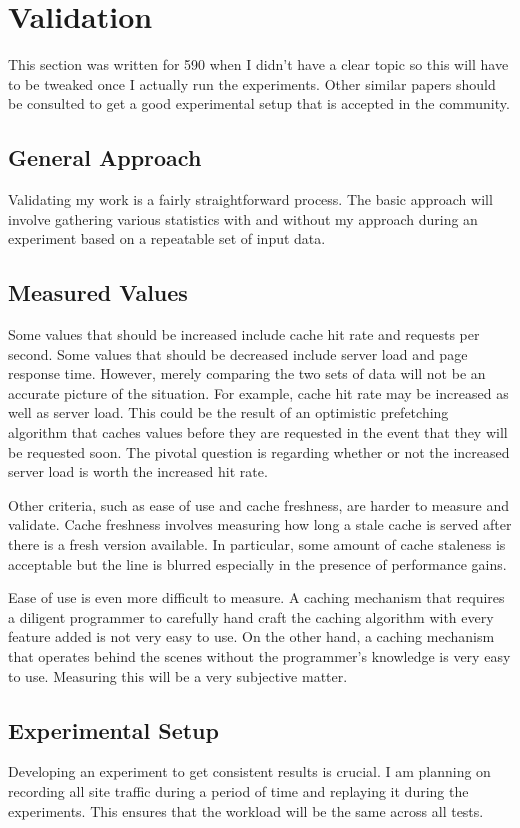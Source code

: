 \documentclass[12pt]{ucthesis}
\begin{document}
\chapter{Validation}
\label{validation}
This section was written for 590 when I didn't have a clear topic so this will have to be tweaked once I actually run the experiments.
Other similar papers should be consulted to get a good experimental setup that is accepted in the community.

\section{General Approach}
Validating my work is a fairly straightforward process.
The basic approach will involve gathering various statistics with and without my approach during an experiment based on a repeatable set of input data. %

\section{Measured Values}
Some values that should be increased include cache hit rate and requests per second.
Some values that should be decreased include server load and page response time.
However, merely comparing the two sets of data will not be an accurate picture of the situation.
For example, cache hit rate may be increased as well as server load.
This could be the result of an optimistic prefetching algorithm that caches values before they are requested in the event that they will be requested soon.
The pivotal question is regarding whether or not the increased server load is worth the increased hit rate.

Other criteria, such as ease of use and cache freshness, are harder to measure and validate.
Cache freshness involves measuring how long a stale cache is served after there is a fresh version available.
In particular, some amount of cache staleness is acceptable but the line is blurred especially in the presence of performance gains.

Ease of use is even more difficult to measure.
A caching mechanism that requires a diligent programmer to carefully hand craft the caching algorithm with every feature added is not very easy to use.
On the other hand, a caching mechanism that operates behind the scenes without the programmer's knowledge is very easy to use.
Measuring this will be a very subjective matter.

\section{Experimental Setup}
Developing an experiment to get consistent results is crucial.
I am planning on recording all site traffic during a period of time and replaying it during the experiments.
This ensures that the workload will be the same across all tests.
\end{document}
